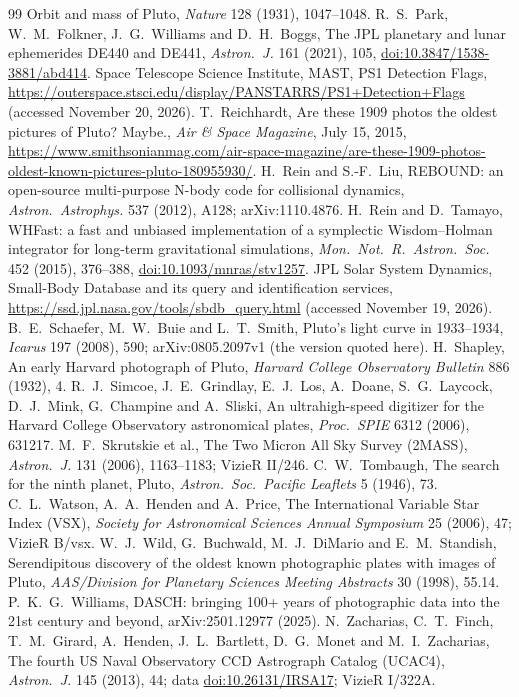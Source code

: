 \documentclass[11pt]{article}
\begin{document}
\begin{thebibliography}{99}
 Orbit and mass of Pluto, \emph{Nature} 128 (1931), 1047--1048.
 R.~S.~Park, W.~M.~Folkner, J.~G.~Williams and D.~H.~Boggs, The JPL planetary and lunar ephemerides DE440 and DE441, \emph{Astron.\ J.} 161 (2021), 105, \href{https://doi.org/10.3847/1538-3881/abd414}{doi:10.3847/1538-3881/abd414}.
 Space Telescope Science Institute, MAST, PS1 Detection Flags, \url{https://outerspace.stsci.edu/display/PANSTARRS/PS1+Detection+Flags} (accessed November 20, 2026).
 T.~Reichhardt, Are these 1909 photos the oldest pictures of Pluto? Maybe., \emph{Air \& Space Magazine}, July 15, 2015, \url{https://www.smithsonianmag.com/air-space-magazine/are-these-1909-photos-oldest-known-pictures-pluto-180955930/}.
 H.~Rein and S.-F.~Liu, REBOUND: an open-source multi-purpose N-body code for collisional dynamics, \emph{Astron.\ Astrophys.} 537 (2012), A128; arXiv:1110.4876.
 H.~Rein and D.~Tamayo, WHFast: a fast and unbiased implementation of a symplectic Wisdom--Holman integrator for long-term gravitational simulations, \emph{Mon.\ Not.\ R.\ Astron.\ Soc.} 452 (2015), 376--388, \href{https://doi.org/10.1093/mnras/stv1257}{doi:10.1093/mnras/stv1257}.
 JPL Solar System Dynamics, Small-Body Database and its query and identification services, \url{https://ssd.jpl.nasa.gov/tools/sbdb_query.html} (accessed November 19, 2026).
 B.~E.~Schaefer, M.~W.~Buie and L.~T.~Smith, Pluto's light curve in 1933--1934, \emph{Icarus} 197 (2008), 590; arXiv:0805.2097v1 (the version quoted here).
 H.~Shapley, An early Harvard photograph of Pluto, \emph{Harvard College Observatory Bulletin} 886 (1932), 4.
 R.~J.~Simcoe, J.~E.~Grindlay, E.~J.~Los, A.~Doane, S.~G.~Laycock, D.~J.~Mink, G.~Champine and A.~Sliski, An ultrahigh-speed digitizer for the Harvard College Observatory astronomical plates, \emph{Proc.\ SPIE} 6312 (2006), 631217.
 M.~F.~Skrutskie et al., The Two Micron All Sky Survey (2MASS), \emph{Astron.\ J.} 131 (2006), 1163--1183; VizieR II/246.
 C.~W.~Tombaugh, The search for the ninth planet, Pluto, \emph{Astron.\ Soc.\ Pacific Leaflets} 5 (1946), 73.
 C.~L.~Watson, A.~A.~Henden and A.~Price, The International Variable Star Index (VSX), \emph{Society for Astronomical Sciences Annual Symposium} 25 (2006), 47; VizieR B/vsx.
 W.~J.~Wild, G.~Buchwald, M.~J.~DiMario and E.~M.~Standish, Serendipitous discovery of the oldest known photographic plates with images of Pluto, \emph{AAS/Division for Planetary Sciences Meeting Abstracts} 30 (1998), 55.14.
 P.~K.~G.~Williams, DASCH: bringing 100+ years of photographic data into the 21st century and beyond, arXiv:2501.12977 (2025).
 N.~Zacharias, C.~T.~Finch, T.~M.~Girard, A.~Henden, J.~L.~Bartlett, D.~G.~Monet and M.~I.~Zacharias, The fourth US Naval Observatory CCD Astrograph Catalog (UCAC4), \emph{Astron.\ J.} 145 (2013), 44; data \href{https://doi.org/10.26131/IRSA17}{doi:10.26131/IRSA17}; VizieR I/322A.
\end{thebibliography}
\end{document}
